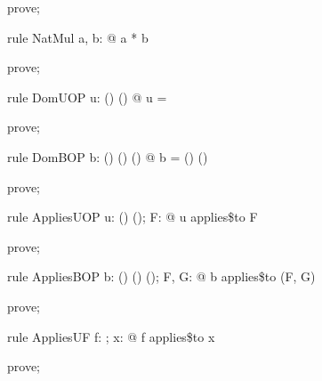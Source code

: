 \documentclass{article}
\begin{document}
\begin{zproof}
prove;
\end{zproof}

\begin{theorem}{rule NatMul}
  \forall a, b: \nat @ a * b \in \nat
\end{theorem}

\begin{zproof}
prove;
\end{zproof}

\begin{theorem}{rule DomUOP}
  \forall u: (\nat \fun \nat) \fun (\nat \fun \nat) @ \dom u = \nat \fun \nat
\end{theorem}

\begin{zproof}
prove;
\end{zproof}

\begin{theorem}{rule DomBOP}
  \forall b: (\nat \fun \nat) \cross (\nat \fun \nat) \fun (\nat \fun \nat) @
    \dom b = (\nat \fun \nat) \cross (\nat \fun \nat)
\end{theorem}

\begin{zproof}
prove;
\end{zproof}

\begin{theorem}{rule AppliesUOP}
  \forall u: (\nat \fun \nat) \fun (\nat \fun \nat); F: \nat \fun \nat @ u applies\$to F
\end{theorem}

\begin{zproof}
prove;
\end{zproof}

\begin{theorem}{rule AppliesBOP}
  \forall b: (\nat \fun \nat) \cross (\nat \fun \nat) \fun (\nat \fun \nat); F, G: \nat \fun \nat @
    b applies\$to (F, G)
\end{theorem}

\begin{zproof}
prove;
\end{zproof}

\begin{theorem}{rule AppliesUF}
  \forall f: \nat \fun \nat; x: \nat @ f applies\$to x
\end{theorem}

\begin{zproof}
prove;
\end{zproof}
\end{document}

